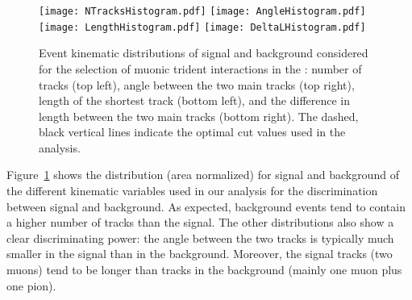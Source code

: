 \begin{figure}[!tb]
\centering
\texttt{[image: NTracksHistogram.pdf]}
\texttt{[image: AngleHistogram.pdf]} \\[0.75\baselineskip]
\texttt{[image: LengthHistogram.pdf]}
\texttt{[image: DeltaLHistogram.pdf]}
\caption[%
Signal and background %
for selecting %
muonic trident interactions in ND LArTPC]{Event kinematic distributions of signal and background considered for the selection of muonic trident interactions in the  : number of tracks (top left), angle between the two main tracks (top right), length of the shortest track (bottom left), and the difference in length between the two main tracks (bottom right). The dashed, black vertical lines indicate the optimal cut values used in the analysis.} \label{fig:trident_kinematics}
\end{figure}

Figure~\ref{fig:trident_kinematics} shows the distribution (area normalized) for signal and background of the different kinematic variables used in our analysis for the discrimination between signal and background. As expected, background events tend to contain a higher number of tracks than the signal. The other distributions also show a clear discriminating power: the angle between the two tracks is typically much smaller in the signal than in the background. Moreover, the signal tracks (two muons) tend to be longer than tracks in the background (mainly one muon plus one pion).

